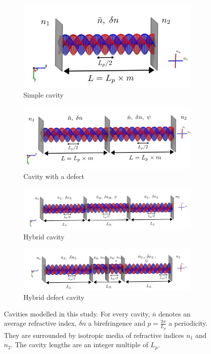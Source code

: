 \begin{figure}
	\centering
	\begin{subfigure}{0.40\linewidth}
		\includegraphics[width=\linewidth]{images/simple_cavity}
		\caption[Simple cavity]{Simple cavity}
		\label{fig:simple_cavity}
	\end{subfigure}
	\begin{subfigure}{0.58\linewidth}
		\includegraphics[width=\linewidth]{images/defect.png}
		\caption{Cavity with a defect}
		\label{fig:defect}
	\end{subfigure}
	\begin{subfigure}{\linewidth}
		\includegraphics[width=\linewidth]{images/hybrid.png}
		\caption{Hybrid cavity}
		\label{fig:hybrid}
	\end{subfigure}
	\begin{subfigure}{\linewidth}
		\includegraphics[width=\linewidth]{images/hybrid_defect.png}
		\caption{Hybrid defect cavity}
		\label{fig:hybrid_defect}
	\end{subfigure}
	\caption[Cavities modelled in this study]{Cavities modelled in this study.  For every cavity, $\bar{n}$ denotes an average refractive index, $\delta n$ a birefringence and $p=\frac{2\pi}{L_p}$ a periodicity. They are surrounded by isotropic media of refractive indices $n_1$ and $n_2$. The cavity lengths are an integer multiple of $L_p$.}
	\label{fig:cavities_blender}
\end{figure}